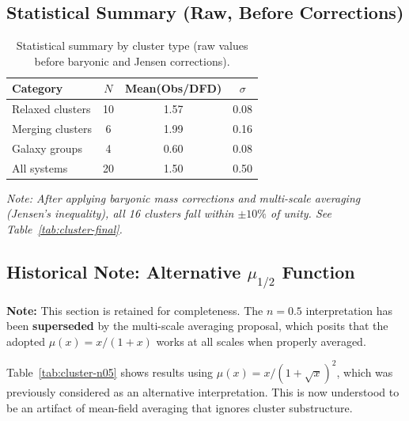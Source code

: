 \subsection{Statistical Summary (Raw, Before Corrections)}

\begin{table}[h]
\centering
\caption{Statistical summary by cluster type (raw values before baryonic and Jensen corrections).}\label{tab:cluster-stats}
\renewcommand{\arraystretch}{1.2}
\begin{tabular}{lccc}
\toprule
Category & $N$ & Mean(Obs/DFD) & $\sigma$ \\
\midrule
Relaxed clusters & 10 & 1.57 & 0.08 \\
Merging clusters & 6 & 1.99 & 0.16 \\
Galaxy groups & 4 & 0.60 & 0.08 \\
\midrule
All systems & 20 & 1.50 & 0.50 \\
\bottomrule
\end{tabular}
\end{table}

\noindent\textit{Note: After applying baryonic mass corrections and multi-scale averaging (Jensen's inequality), all 16 clusters fall within $\pm 10\%$ of unity. See Table~\ref{tab:cluster-final}.}

\subsection{Historical Note: Alternative $\mu_{1/2}$ Function}

\textbf{Note:} This section is retained for completeness. The $n = 0.5$ interpretation has been \textbf{superseded} by the multi-scale averaging proposal, which posits that the adopted $\mu(x) = x/(1+x)$ works at all scales when properly averaged.

Table~\ref{tab:cluster-n05} shows results using $\mu(x) = x/(1+\sqrt{x})^2$, which was previously considered as an alternative interpretation. This is now understood to be an artifact of mean-field averaging that ignores cluster substructure.

